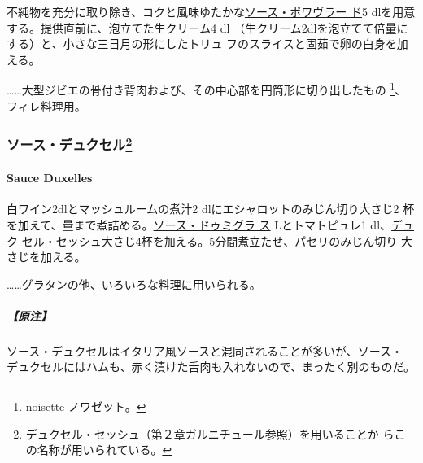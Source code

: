 \begin{recette}
  

不純物を充分に取り除き、コクと風味ゆたかな\protect\hyperlink{sauce-poivrade}{ソース・ポワヴラー
ド}5 dlを用意する。提供直前に、泡立てた生クリーム4 dl
（生クリーム2dlを泡立てて倍量にする）と、小さな三日月の形にしたトリュ
フのスライスと固茹で卵の白身を加える。

\ldots{}\ldots{}大型ジビエの骨付き背肉および、その中心部を円筒形に切り出したもの
\footnote{noisette ノワゼット。}、フィレ料理用。

\maeaki

\hypertarget{ux30bdux30fcux30b9ux30c7ux30e5ux30afux30bbux30eb29}{%
\subsubsection[ソース・デュクセル]{\texorpdfstring{ソース・デュクセル\footnote{デュクセル・セッシュ（第２章ガルニチュール参照）を用いることか
  らこの名称が用いられている。}}{ソース・デュクセル}}\label{ux30bdux30fcux30b9ux30c7ux30e5ux30afux30bbux30eb29}}

\hypertarget{sauce-duxelles}{%
\paragraph{Sauce Duxelles}\label{sauce-duxelles}}

  

白ワイン2dlとマッシュルームの煮汁2 dlにエシャロットのみじん切り大さじ2
杯を加えて、\untiers{}量まで煮詰める。\protect\hyperlink{sauce-demi-glace}{ソース・ドゥミグラ
ス}\undemi{} Lとトマトピュレ1\undemi{} dl、\href{}{デュク
セル・セッシュ}大さじ4杯を加える。5分間煮立たせ、パセリのみじん切り
大さじ\undemi{}を加える。

\ldots{}\ldots{}グラタンの他、いろいろな料理に用いられる。

\hypertarget{ux539fux6ce8-1}{%
\subparagraph{【原注】}\label{ux539fux6ce8-1}}

ソース・デュクセルはイタリア風ソースと混同されることが多いが、ソース・
デュクセルにはハムも、赤く漬けた舌肉も入れないので、まったく別のものだ。

\maeaki

\hypertarget{ux30bdux30fcux30b9ux30a8ux30b9ux30c8ux30e9ux30b4ux30f3}{%
}
\end{recette}
